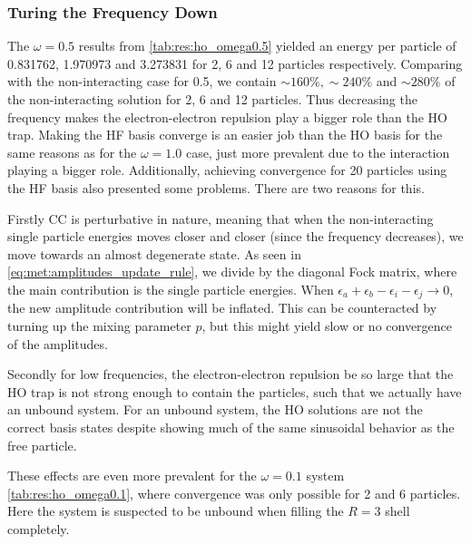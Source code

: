 \subsubsection{Turing the Frequency Down}
The $\omega = 0.5$ results from \cref{tab:res:ho_omega0.5} yielded an energy per particle of 0.831762, 1.970973 and 3.273831 for 2, 6 and 12 particles respectively. Comparing with the non-interacting case for 0.5, we contain $\sim 160\%,\sim 240\%$ and $\sim 280\%$ of the non-interacting solution for 2, 6 and 12 particles. Thus decreasing the frequency makes the electron-electron repulsion play a bigger role than the HO trap. Making the HF basis converge is an easier job than the HO basis for the same reasons as for the $\omega = 1.0$ case, just more prevalent due to the interaction playing a bigger role. Additionally, achieving convergence for 20 particles using the HF basis also presented some problems. There are two reasons for this.

Firstly CC is perturbative in nature, meaning that when the non-interacting single particle energies moves closer and closer (since the frequency decreases), we move towards an almost degenerate state. As seen in \cref{eq:met:amplitudes_update_rule}, we divide by the diagonal Fock matrix, where the main contribution is the single particle energies. When  $\epsilon_a + \epsilon_b - \epsilon_i - \epsilon_j \rightarrow 0$, the new amplitude contribution will be inflated. This can be counteracted by turning up the mixing parameter $p$, but this might yield slow or no convergence of the amplitudes.

Secondly for low frequencies, the electron-electron repulsion be so large that the HO trap is not strong enough to contain the particles, such that we actually have an unbound system. For an unbound system, the HO solutions are not the correct basis states despite showing much of the same sinusoidal behavior as the free particle.   

These effects are even more prevalent for the $\omega = 0.1$ system \cref{tab:res:ho_omega0.1}, where convergence was only possible for 2 and 6 particles. Here the system is suspected to be unbound when filling the $R=3$ shell completely.
